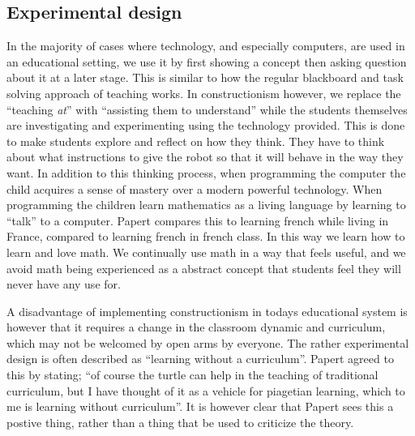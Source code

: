 \subsection{Experimental design}
In the majority of cases where technology, and especially computers, are used in an educational setting, we use it by first showing a concept then asking question about it at a later stage. 
This is similar to how the regular blackboard and task solving approach of teaching works. 
In constructionism however, we replace the "`teaching \textit{at}"' with "`assisting them to understand"' while the students themselves are investigating and experimenting using the technology provided. 
This is done to make students explore and reflect on how they think. They have to think about what instructions to give the robot so that it will behave in the way they want. In addition to this thinking process, when programming the computer the child acquires a sense of mastery over a modern powerful technology. When programming the children learn mathematics as a living language by learning to ``talk'' to a computer. Papert compares this to learning french while living in France, compared to learning french in french class. In this way we learn how to learn and love math. We continually use math in a way that feels useful, and we avoid math being experienced as a abstract concept that students feel they will never have any use for. 

\bigskip\noindent
A disadvantage of implementing constructionism in todays educational system is however that it requires a change in the classroom dynamic and curriculum, which may not be welcomed by open arms by everyone. 
The rather experimental design is often described as ``learning without a curriculum''. Papert agreed to this by stating; ``of course the turtle can help in the teaching of traditional curriculum, but I have thought of it as a vehicle for piagetian learning, which to me is learning without curriculum''. It is however clear that Papert sees this a postive thing, rather than a thing that be used to criticize the theory. 

